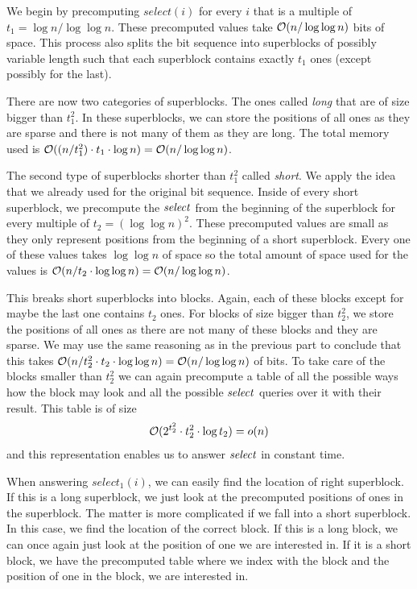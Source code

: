 We begin by precomputing $select(i)$ for every $i$ that is a
multiple of $t_1=\log n/\log\log n$. These precomputed values take $\mathcal{O}(n/\log\log n)$ bits of space.
This process also splits the bit sequence into superblocks of possibly variable length such that
each superblock contains exactly $t_1$ ones (except possibly for the last).

There are now two categories of superblocks. The ones called \textit{long} that are of size bigger
than $t_1^2$. In these superblocks, we can store the positions of all ones as they are sparse
and there is not many of them as they are long. The total memory used is $\mathcal{O}((n/t_1^2)\cdot t_1\cdot
\log n) = \mathcal{O}(n/\log\log n)$.

The second type of superblocks shorter than $t_1^2$ called
\textit{short}. We apply the idea that we already used for the original bit sequence. Inside of
every short superblock, we precompute the $\mathit{select}$ from the beginning of the superblock for every
multiple of $t_2=(\log\log n)^2$. These precomputed values are small as they only represent positions
from the beginning of a short superblock. Every one of these values takes $\log\log n$ of space so the
total amount of space used for the values is $\mathcal{O}(n/t_2\cdot \log\log n) = \mathcal{O}(n/\log\log n)$.

This breaks short superblocks into blocks. Again, each of these blocks except for maybe the
last one contains $t_2$ ones. For blocks of size bigger than $t_2^2$, we store the positions of all
ones as there are not many of these blocks and they are sparse. We may use the same reasoning as
in the previous part to conclude that this takes $\mathcal{O}(n/t_2^2\cdot t_2\cdot \log\log n) = \mathcal{O}(n/\log\log n)$
of bits. To take care of the blocks smaller than $t_2^2$ we can again precompute a table of all
the possible ways how the block may look and all the possible $\mathit{select}$ queries over it with
their result. This table is of size $$\mathcal{O}(2^{t_2^2}\cdot t_2^2 \cdot \log t_2) = o(n)$$
and this representation enables us to answer $\mathit{select}$ in constant time.

When answering $select_1(i)$, we can easily find the location of right superblock. If this
is a long superblock, we just look at the precomputed positions of ones in the superblock.
The matter is more complicated if we fall into a short superblock. In this case, we find
the location of the correct block. If this is a long block, we can once again just look
at the position of one we are interested in. If it is a short block, we have the precomputed
table where we index with the block and the position of one in the block, we are interested in.

